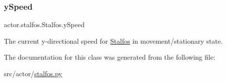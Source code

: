 \subsubsection{\texorpdfstring{y\+Speed}{ySpeed}}
{\footnotesize\ttfamily actor.\+stalfos.\+Stalfos.\+y\+Speed}



The current y-\/directional speed for \hyperlink{classactor_1_1stalfos_1_1_stalfos}{Stalfos} in movement/stationary state. 



The documentation for this class was generated from the following file\+:\begin{DoxyCompactItemize}
\item 
src/actor/\hyperlink{stalfos_8py}{stalfos.\+py}\end{DoxyCompactItemize}

